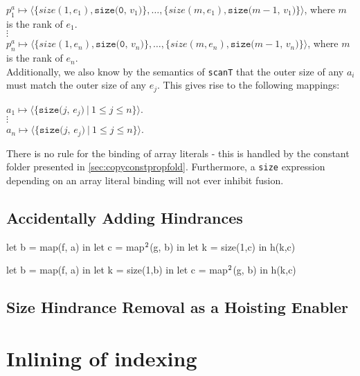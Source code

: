 \begin{description}
  $p^{a}_{1} \mapsto \langle\{size(1, e_{1}), \texttt{size(0, $v_{1}$)}\}, \ldots, \{size(m, e_{1}), \texttt{size($m-1$, $v_{1}$)}\}\rangle$, where $m$ is the rank of $e_{1}$. \\
  $\vdots$\\
  $p^{a}_{n} \mapsto \langle\{size(1, e_{n}), \texttt{size(0, $v_{n}$)}\}, \ldots, \{size(m, e_{n}), \texttt{size($m-1$, $v_{n}$)}\}\rangle$, where $m$ is the rank of $e_{n}$. \\

  Additionally, we also know by the semantics of \texttt{scanT} that
  the outer size of any $a_{i}$ must match the outer size of any
  $e_{j}$.  This gives rise to the following mappings:

  $a_{1} \mapsto \langle\{\texttt{size($j$, $e_{j}$)}\ |\ 1 \leq j \leq n\}\rangle$. \\
  $\vdots$\\
  $a_{n} \mapsto \langle\{\texttt{size($j$, $e_{j}$)}\ |\ 1 \leq j \leq n\}\rangle$. \\
\end{description}

There is no rule for the binding of array literals - this is handled
by the constant folder presented in \cref{sec:copyconstpropfold}.
Furthermore, a \texttt{size} expression depending on an array literal
binding will not ever inhibit fusion.

\subsection{Accidentally Adding Hindrances}
\label{sec:accidentally-adding-hindrances}

\begin{colorcode}
let b = map(f, a) in
let c = map\(^{2}\)(g, b) in
let k = size(1,c) in
h(k,c)
\end{colorcode}

\begin{colorcode}
let b = map(f, a) in
let k = size(1,b) in
let c = map\(^{2}\)(g, b) in
h(k,c)
\end{colorcode}

\subsection{Size Hindrance Removal as a Hoisting Enabler}

\section{Inlining of indexing}
\label{sec:inlining-indexing}

